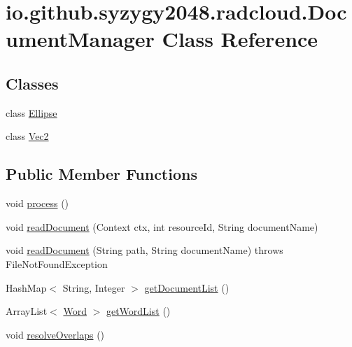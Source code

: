 \hypertarget{classio_1_1github_1_1syzygy2048_1_1radcloud_1_1_document_manager}{}\section{io.\+github.\+syzygy2048.\+radcloud.\+Document\+Manager Class Reference}
\label{classio_1_1github_1_1syzygy2048_1_1radcloud_1_1_document_manager}
\subsection*{Classes}
\begin{DoxyCompactItemize}
\item 
class \mbox{\hyperlink{classio_1_1github_1_1syzygy2048_1_1radcloud_1_1_document_manager_1_1_ellipse}{Ellipse}}
\item 
class \mbox{\hyperlink{classio_1_1github_1_1syzygy2048_1_1radcloud_1_1_document_manager_1_1_vec2}{Vec2}}
\end{DoxyCompactItemize}
\subsection*{Public Member Functions}
\begin{DoxyCompactItemize}
\item 
void \mbox{\hyperlink{classio_1_1github_1_1syzygy2048_1_1radcloud_1_1_document_manager_a00bcd6e86e3cd7b82122d06c09135963}{process}} ()
\item 
void \mbox{\hyperlink{classio_1_1github_1_1syzygy2048_1_1radcloud_1_1_document_manager_ae2fd7551555ca6e97cab1ea87a4ab477}{read\+Document}} (Context ctx, int resource\+Id, String document\+Name)
\item 
void \mbox{\hyperlink{classio_1_1github_1_1syzygy2048_1_1radcloud_1_1_document_manager_a917f02cb6436d96077b0e093751710ec}{read\+Document}} (String path, String document\+Name)  throws File\+Not\+Found\+Exception 
\item 
Hash\+Map$<$ String, Integer $>$ \mbox{\hyperlink{classio_1_1github_1_1syzygy2048_1_1radcloud_1_1_document_manager_a64e9767900c245d1c77cdf12dc92c807}{get\+Document\+List}} ()
\item 
Array\+List$<$ \mbox{\hyperlink{classio_1_1github_1_1syzygy2048_1_1radcloud_1_1_word}{Word}} $>$ \mbox{\hyperlink{classio_1_1github_1_1syzygy2048_1_1radcloud_1_1_document_manager_a8868166a68ecfa01206268e13c3560ea}{get\+Word\+List}} ()
\item 
void \mbox{\hyperlink{classio_1_1github_1_1syzygy2048_1_1radcloud_1_1_document_manager_ac4e94090407ff6f6c1d3b2f7c02cec83}{resolve\+Overlaps}} ()
\end{DoxyCompactItemize}

